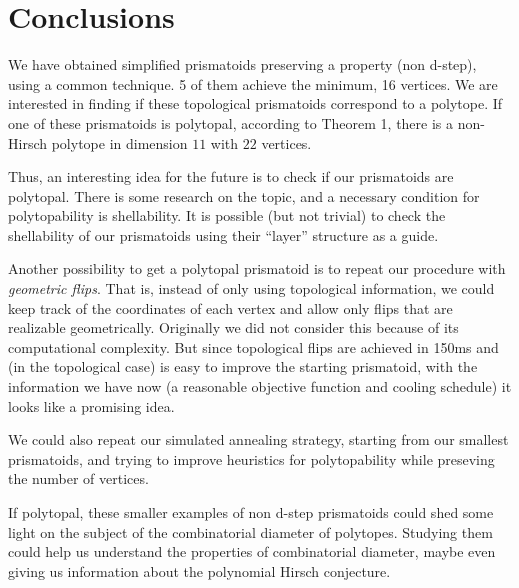 \documentclass[12pt,a4paper]{article}
\theoremstyle{plain}
\theoremstyle{definition}
\begin{document}
\section{Conclusions}
We have obtained simplified prismatoids preserving a property (non d-step), using a common technique. 5 of them achieve the minimum, 16 vertices. We are interested in finding if these topological prismatoids correspond to a polytope. If one of these prismatoids is polytopal, according to Theorem 1, there is a non-Hirsch polytope in dimension $11$ with $22$ vertices.

Thus, an interesting idea for the future is to check if our prismatoids are polytopal. There is some research on the topic, and a necessary condition for polytopability is shellability. It is possible (but not trivial) to check the shellability of our prismatoids using their ``layer'' structure as a guide.

Another possibility to get a polytopal prismatoid is to repeat our procedure with \emph{geometric flips}. That is, instead of only using topological information, we could keep track of the coordinates of each vertex and allow only flips that are realizable geometrically. Originally we did not consider this because of its computational complexity. But since topological flips are achieved in 150ms and (in the topological case) is easy to improve the starting prismatoid, with the information we have now (a reasonable objective function and cooling schedule) it looks like a promising idea.

We could also repeat our simulated annealing strategy, starting from our smallest prismatoids, and trying to improve heuristics for polytopability while preseving the number of vertices.

If polytopal, these smaller examples of non d-step prismatoids could shed some light on the subject of the combinatorial diameter of polytopes. Studying them could help us understand the properties of combinatorial diameter, maybe even giving us information about the polynomial Hirsch conjecture.
\end{document}
